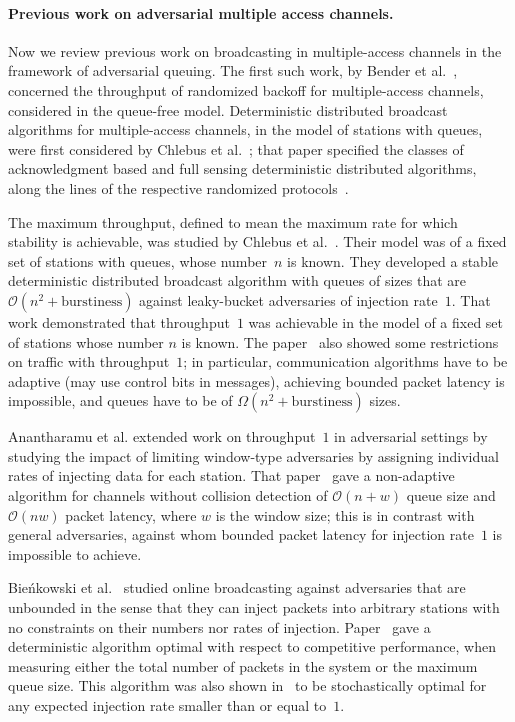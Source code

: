 \documentclass[11pt]{article}
\newcommand{\BBB}{\vspace*{-\bigskipamount}}
\newcommand{\cO}{\mathcal{O}}
\newcommand{\Paragraph}[1]{\BBB\paragraph{#1}}
\begin{document}
\Paragraph{Previous work on adversarial multiple access channels.}


Now we review previous work on broadcasting in multiple-access channels in the framework of adversarial queuing.
The first such work, by Bender et al.~\cite{BenderFHKL05}, concerned the throughput of randomized backoff for multiple-access channels, considered in the queue-free model.
Deterministic distributed broadcast algorithms for multiple-access channels, in the model of  stations with queues, were first considered  by Chlebus et al.~\cite{ChlebusKR-TALG12}; that paper 
 specified the classes of acknowledgment based and full sensing deterministic distributed algorithms, along the lines of the respective randomized protocols~\cite{Chlebus-randomized-radio-chapter-2001}.

The maximum throughput, defined to mean the maximum rate for which stability is achievable, was studied by Chlebus et al.~\cite{ChlebusKR09}.
Their model was of a fixed set of stations with queues, whose number~$n$ is known.
They developed a stable deterministic distributed broadcast algorithm with  queues of sizes that are  $\cO(n^2+\text{burstiness})$ against leaky-bucket adversaries of injection rate~$1$.
That work demonstrated that throughput~$1$ was achievable in the model of a fixed set of stations whose number $n$ is known.
The paper~\cite{ChlebusKR09} also showed some restrictions on traffic with throughput~$1$; in particular,  communication algorithms have to be adaptive (may use control bits in messages),  achieving bounded packet latency is impossible, and queues have to be of $\Omega(n^2+\text{burstiness})$ sizes.

Anantharamu et al. \cite{AnantharamuCR-TCS17} extended work on throughput~$1$ in adversarial settings by studying the impact of limiting window-type adversaries by assigning individual rates of injecting data for each station.
That paper~\cite{AnantharamuCR-TCS17} gave  a non-adaptive algorithm for channels without collision detection of $\cO(n+w)$ queue size and $\cO(nw)$ packet latency, where $w$ is the window size; this is in contrast with general adversaries, against whom bounded packet latency for injection rate~$1$ is impossible to achieve.


Bie{\'n}kowski et al.~\cite{BienkowskiJKK-DISC12} studied online broadcasting against  adversaries that are unbounded in the sense that they can inject packets into arbitrary stations with no constraints on their numbers nor rates of injection.
Paper~\cite{BienkowskiJKK-DISC12} gave a deterministic algorithm optimal with respect to competitive performance,  when measuring either the total number of packets in the system or the maximum queue size.
This algorithm was also shown in~\cite{BienkowskiJKK-DISC12} to be  stochastically optimal for any expected injection rate smaller than or equal to~$1$.
\end{document}
